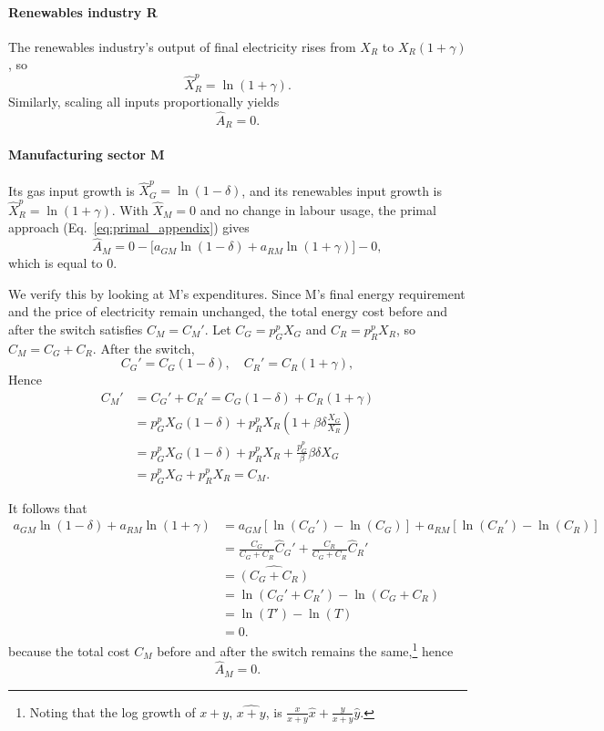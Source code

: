 \documentclass[11pt]{article}
\begin{document}
\paragraph{Renewables industry R}
The renewables industry's output of final electricity rises from $X_R$ to $X_R(1+\gamma)$, so
\[
    \hat{X}_R^p
= \ln(1+\gamma).
\]
Similarly, scaling all inputs proportionally yields
\[
    \hat{A}_R = 0.
\]

\paragraph{Manufacturing sector M}
Its gas input growth is $\hat{X}_G^p=\ln(1-\delta)$, and its renewables input growth is $\hat{X}_R^p=\ln(1+\gamma)$. With $\hat{X}_M=0$ and no change in labour usage, the primal approach (Eq.~\ref{eq:primal_appendix}) gives
\[
    \hat{A}_M
= 0
  - \bigl[a_{GM}\ln(1-\delta)
     + a_{RM}\ln(1+\gamma)\bigr]
  - 0,
\]
which is equal to 0. 

We verify this by looking at M's expenditures. Since M's final energy requirement and the price of electricity remain unchanged, the total energy cost before and after the switch satisfies \(C_M = C_M'\). Let \(C_G = p_G^pX_G\) and \(C_R = p_R^pX_R\), so \(C_M = C_G + C_R\). After the switch,
\[
   C_G' = C_G(1-\delta), \quad
   C_R' = C_R(1+\gamma),\]
   Hence
\begin{equation}
\label{eq_cost_argument_M}
\begin{aligned}
         C_M'&=C_G'+C_R'=C_G  (1-\delta)+C_R(1+\gamma)\\&
     =p_G^pX_G  (1-\delta)+p_R^pX_R\left(1+\beta\delta\frac{X_G}{X_R}\right)\\
    &= p_G^pX_G  (1-\delta)+p_R^pX_R+\frac{p_G^p}{\beta}\beta \delta X_G\\
     &= p_G^pX_G +p_R^pX_R
     =C_M.
\end{aligned}
\end{equation}

It follows that
\begin{equation}
 \label{eq_weighted_share_change_cost}
\begin{aligned}
a_{GM} \ln(1-\delta) + a_{RM} \ln(1+\gamma)&= 
a_{GM}\left[ \ln(C_G') - \ln(C_G) \right] + 
a_{RM} \left[ \ln(C_R') - \ln(C_R) \right]\\&= 
\frac{C_G}{C_G + C_R} \hat{C}_G' + 
\frac{C_R}{C_G + C_R} \hat{C}_R'\\
  &=\widehat{(C_G+C_R)}\\
 &=   \ln(C_G' + C_R') - \ln(C_G + C_R) \\
&=\ln(T') - \ln(T)  \\
&= 0.
\end{aligned}
\end{equation}
because the total cost $C_M$ before and after the switch remains the same,\footnote{
Noting that the log growth of $x+y$, $\widehat{x+y}$, is $\frac{x}{x+y} \hat{x} + \frac{y}{x+y} \hat{y}$.
}
 hence
\[
    \hat{A}_M=0.
\]
\end{document}
